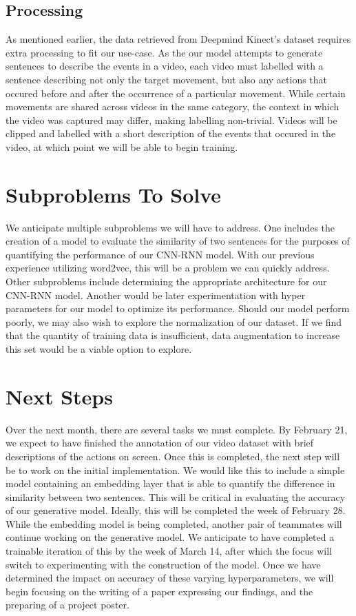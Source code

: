 \documentclass[11pt]{article}
\begin{document}
\subsection{Processing}
As mentioned earlier, the data retrieved from Deepmind Kinect's dataset requires extra processing to fit our use-case.
As the our model attempts to generate sentences to describe
the events in a video, each video must labelled with a sentence describing not only the target movement, but also
any actions that occured before and after the occurrence of a particular movement. While certain movements are shared
across videos in the same category, the context in which the video was captured may differ, making labelling non-trivial.
Videos will be clipped and labelled with a short description of the events that occured in the video, at which point we will be able
to begin training.

\section{Subproblems To Solve}
We anticipate multiple subproblems we will have to address. One includes the creation of a model to evaluate the similarity of two 
sentences for the purposes of quantifying the performance of our CNN-RNN model. With our previous experience utilizing word2vec, this 
will be a problem we can quickly address. Other subproblems include determining the appropriate architecture for our CNN-RNN model. 
Another would be later experimentation with hyper parameters for our model to optimize its performance. Should our model perform poorly, 
we may also wish to explore the normalization of our dataset. If we find that the quantity of training data is insufficient, data 
augmentation to increase this set would be a viable option to explore.

\section{Next Steps}
Over the next month, there are several tasks we must complete. By February 21, we expect to have finished the annotation of our video 
dataset with brief descriptions of the actions on screen. Once this is completed, the next step will be to work on the initial implementation. 
We would like this to include a simple model containing an embedding layer that is able to quantify the difference in similarity between 
two sentences. This will be critical in evaluating the accuracy of our generative model. Ideally, this will be completed the week of February 28. 
While the embedding model is being completed, another pair of teammates will continue working on the generative model. We anticipate to have completed 
a trainable iteration of this by the week of March 14, after which the focus will switch to experimenting with the construction of the model. Once we 
have determined the impact on accuracy of these varying hyperparameters, we will begin focusing on the writing of a paper expressing our findings, and the 
preparing of a project poster.
\end{document}
